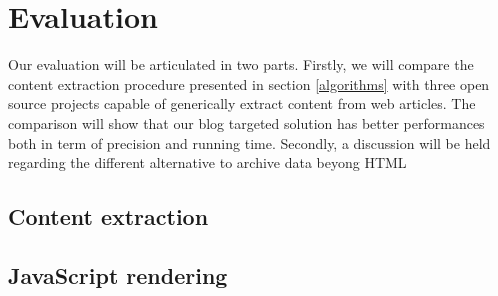 \section{Evaluation}

Our evaluation will be articulated in two parts. Firstly, we will compare the content extraction procedure presented in section \ref{algorithms} with three open source projects capable of generically extract content from web articles. The comparison will show that our blog targeted solution has better performances both in term of precision and running time. Secondly, a discussion will be held regarding the different alternative to archive data beyong HTML



\subsection{Content extraction}



\precisionTable





\subsection{JavaScript rendering}





